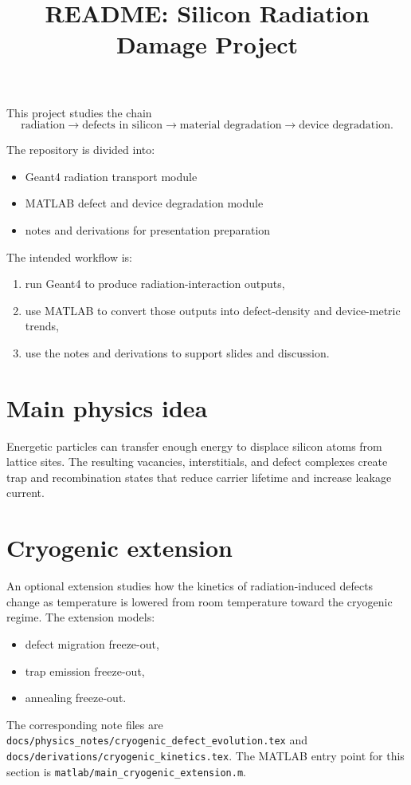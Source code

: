 \documentclass[11pt]{article}
\title{README: Silicon Radiation Damage Project}
\begin{document}
\maketitle

This project studies the chain
\[
\text{radiation} \rightarrow \text{defects in silicon} \rightarrow \text{material degradation} \rightarrow \text{device degradation}.
\]

The repository is divided into:
\begin{itemize}
    \item Geant4 radiation transport module
    \item MATLAB defect and device degradation module
    \item notes and derivations for presentation preparation
\end{itemize}

The intended workflow is:
\begin{enumerate}
    \item run Geant4 to produce radiation-interaction outputs,
    \item use MATLAB to convert those outputs into defect-density and device-metric trends,
    \item use the notes and derivations to support slides and discussion.
\end{enumerate}

\section*{Main physics idea}
Energetic particles can transfer enough energy to displace silicon atoms from lattice sites. The resulting vacancies, interstitials, and defect complexes create trap and recombination states that reduce carrier lifetime and increase leakage current.

\section*{Cryogenic extension}
An optional extension studies how the kinetics of radiation-induced defects change as temperature is lowered from room temperature toward the cryogenic regime. The extension models:
\begin{itemize}
    \item defect migration freeze-out,
    \item trap emission freeze-out,
    \item annealing freeze-out.
\end{itemize}
The corresponding note files are \texttt{docs/physics\_notes/cryogenic\_defect\_evolution.tex} and \texttt{docs/derivations/cryogenic\_kinetics.tex}. The MATLAB entry point for this section is \texttt{matlab/main\_cryogenic\_extension.m}.
\end{document}
